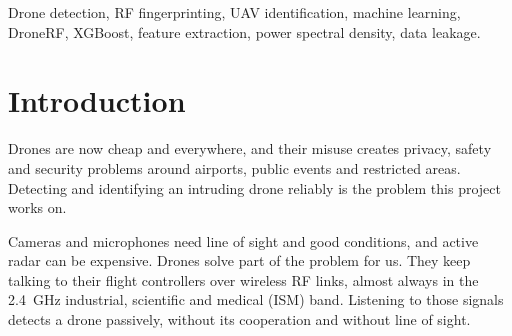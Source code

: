 \documentclass[11pt,conference,a4paper]{IEEEtran}
\begin{document}
\begin{abstract}
Drones communicate with their controllers over radio-frequency (RF) links.
Listening to those signals is a passive way to detect and identify a drone that
works without line of sight or good lighting, unlike cameras and radar. This
project builds a machine-learning pipeline on the public DroneRF dataset that
answers three questions about a recorded RF segment. Is a drone present. Which
drone family is it. Which recorded operating condition is most likely. Raw
captures from the 2.4~GHz ISM band are cut into segments and turned into a
2048-point power-spectrum feature vector using the Fast Fourier Transform over
the low and high RF sub-bands. We compare four classical classifiers on each
task. They are Logistic Regression, Random Forest, Support Vector Machine with
an RBF kernel, and XGBoost. The evaluation groups every segment of one recording
into the same fold so the model never sees its test recordings during training.
Drone presence reaches a macro-F1 of 1.000. Drone family (background, Parrot
Bebop, Parrot AR, DJI Phantom) reaches 1.000 for XGBoost. The harder 10-class
operating-condition task reaches 0.492 for XGBoost under 5-fold
cross-validation, well above the roughly 0.37 of the linear and bagging models.
A noise test shows family accuracy drops from 0.900 on clean data to 0.294 at
$-5$~dB SNR, which measures how much the shared Wi-Fi and Bluetooth traffic in
the band hurts the models. The system is an interpretable, low-cost tool for
studying the dataset, not a deployed counter-drone system.
\end{abstract}

\begin{IEEEkeywords}
Drone detection, RF fingerprinting, UAV identification, machine learning,
DroneRF, XGBoost, feature extraction, power spectral density, data leakage.
\end{IEEEkeywords}

\section{Introduction}
Drones are now cheap and everywhere, and their misuse creates privacy, safety
and security problems around airports, public events and restricted areas.
Detecting and identifying an intruding drone reliably is the problem this
project works on.

Cameras and microphones need line of sight and good conditions, and active radar
can be expensive. Drones solve part of the problem for us. They keep talking to
their flight controllers over wireless RF links, almost always in the 2.4~GHz
industrial, scientific and medical (ISM) band. Listening to those signals
detects a drone passively, without its cooperation and without line of sight.
\end{document}
